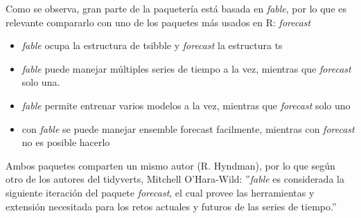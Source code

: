 Como se observa, gran parte de la paquetería está basada en \textit{fable}, por lo que es relevante compararlo con uno de los paquetes más usados en R: \textit{forecast}

\begin{itemize}
    \item \textit{fable} ocupa la estructura de tsibble y \textit{forecast} la estructura ts
    \item \textit{fable} puede manejar múltiples series de tiempo a la vez, mientras que \textit{forecast} solo una. 
    \item \textit{fable} permite entrenar varios modelos a la vez, mientras que \textit{forecast} solo uno 
    \item con \textit{fable} se puede manejar ensemble forecast facilmente, mientras con \textit{forecast} no es posible hacerlo
\end{itemize}

Ambos paquetes comparten un mismo autor (R. Hyndman), por lo que según otro de los autores del tidyverts, Mitchell O'Hara-Wild: ''\textit{fable} es considerada la siguiente iteración del paquete \textit{forecast}, el cual provee las herramientas y extensión necesitada para los retos actuales y futuros de las series de tiempo.''